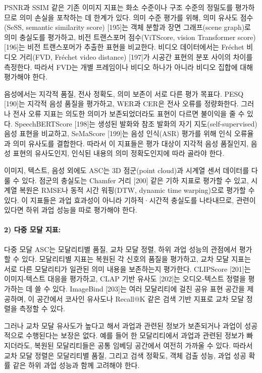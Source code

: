 PSNR과 SSIM 같은 기존 이미지 지표는 화소 수준이나 구조 수준의 정밀도를 평가하므로 의미 손실을 포착하는 데 한계가 있다. 의미 수준 평가를 위해, 의미 유사도 점수(SeSS, semantic similarity score) [195]는 객체 분할과 장면 그래프(scene graph)로 의미 충실도를 평가하고, 비전 트랜스포머 점수(ViTScore, vision Transformer score) [196]는 비전 트랜스포머가 추출한 표현을 비교한다. 비디오 데이터에서는 Fréchet 비디오 거리(FVD, Fréchet video distance) [197]가 시공간 표현의 분포 사이의 차이를 측정한다. 따라서 FVD는 개별 프레임이나 비디오 하나가 아니라 비디오 집합에 대해 평가해야 한다.

음성에서는 지각적 품질, 전사 정확도, 의미 보존이 서로 다른 평가 목표다. PESQ [190]는 지각적 음성 품질을 평가하고, WER과 CER은 전사 오류를 정량화한다. 그러나 전사 오류 지표는 의도한 의미가 보존되었더라도 표현이 다르면 불이익을 줄 수 있다. SpeechBERTScore [198]는 생성된 발화와 참조 발화의 자기 지도(self-supervised) 음성 표현을 비교하고, SeMaScore [199]는 음성 인식(ASR) 평가를 위해 인식 오류율과 의미 유사도를 결합한다. 따라서 이 지표들은 평가 대상이 지각적 음성 품질인지, 음성 표현의 유사도인지, 인식된 내용의 의미 정확도인지에 따라 골라야 한다.

이미지, 텍스트, 음성 외에도 ASC는 3D 점군(point cloud)과 시계열 센서 데이터를 다룰 수 있다. 점군의 충실도는 Chamfer 거리 [200] 같은 기하 지표로 평가할 수 있고, 시계열 복원은 RMSE나 동적 시간 워핑(DTW, dynamic time warping)으로 평가할 수 있다. 이 지표들은 과업 효과성이 아니라 기하적·시간적 충실도를 나타내므로, 관련이 있다면 하위 과업 성능을 따로 평가해야 한다.

\paragraph{2) 다중 모달 지표:}
다중 모달 ASC는 모달리티별 품질, 교차 모달 정렬, 하위 과업 성능의 관점에서 평가할 수 있다. 모달리티별 지표는 복원된 각 신호의 품질을 평가하고, 교차 모달 지표는 서로 다른 모달리티가 일관된 의미 내용을 보존하는지 평가한다. CLIPScore [201]는 이미지-텍스트 대응을 평가하고, CLAP 기반 유사도 [202]는 오디오-텍스트 정렬을 평가하는 데 쓸 수 있다. ImageBind [203]는 여러 모달리티에 걸친 공유 표현 공간을 제공하며, 이 공간에서 코사인 유사도나 Recall@K 같은 검색 기반 지표로 교차 모달 정렬을 측정할 수 있다.

그러나 교차 모달 유사도가 높다고 해서 과업과 관련된 정보가 보존되거나 과업이 성공적으로 수행된다는 보장은 없다. 예를 들어 한 모달리티에서 과업과 관련된 정보가 빠지더라도, 복원된 모달리티들은 공통 임베딩 공간에서 여전히 가까울 수 있다. 따라서 교차 모달 정렬은 모달리티별 품질, 그리고 검색 정확도, 객체 검출 성능, 과업 성공 확률 같은 하위 과업 성능과 함께 고려해야 한다.

